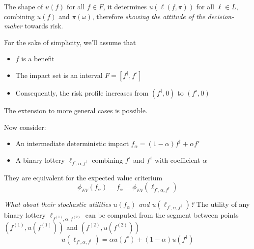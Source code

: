 The shape of $u(f)$ for all $f \in F$, it determines $u(\ell(f, \pi))$ for all $\ell \in L$, combining $u(f)$ and $\pi (\omega)$, therefore \textit{showing the attitude of the decision-maker} towards risk.

For the sake of simplicity, we'll assume that
\begin{itemize}
	\item $f$ is a benefit
	
	\item The impact set is an interval $F = \left[f^\dag, f^\circ\right]$
	
	\item Consequently, the risk profile increases from $(f^\dag, 0)$ to $(f^\circ, 0)$
\end{itemize}

The extension to more general cases is possible.

Now consider: 
\begin{itemize}
	\item An intermediate deterministic impact $f_\alpha = (1 - \alpha) f^\dag + \alpha f^\circ$
	
	\item A binary lottery $\ell_{f^\circ, \alpha, f^\dag}$ combining $f^\circ$ and $f^\dag$ with coefficient $\alpha$
\end{itemize}

They are equivalent for the expected value criterium
$$ \phi_{EV} (f_\alpha) = f_\alpha = \phi_{EV} \left(\ell_{f^\circ, \alpha, f^\dag}\right)$$

\textit{What about their stochastic utilities $u(f_\alpha)$ and $u \left(\ell_{f^\circ, \alpha, f^\dag}\right)$?} The utility of any binary lottery $\ell_{f^{(1)}, \alpha, f^{(2)}}$ can be computed from the segment between points $\left(f^{(1)}, u\left(f^{(1)}\right)\right)$ and  $\left(f^{(2)}, u\left(f^{(2)}\right)\right)$
$$ u \left(\ell_{f^\circ, \alpha, f^\dag}\right) = \alpha u \left(f^\circ\right) + \left(1 - \alpha\right)u \left(f^\dag\right) $$

